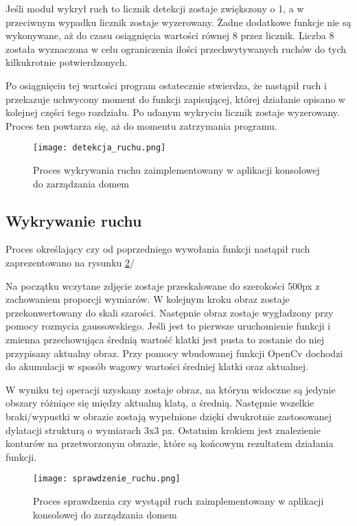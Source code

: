 Jeśli moduł wykrył ruch to licznik detekcji zostaje zwiększony o 1, a w przeciwnym wypadku licznik zostaje wyzerowany. Żadne dodatkowe funkcje nie są wykonywane, aż do czasu osiągnięcia wartości równej 8 przez licznik. Liczba 8 została wyznaczona w celu ograniczenia ilości przechwytywanych ruchów do tych kilkukrotnie potwierdzonych.

Po osiągnięciu tej wartości program ostatecznie stwierdza, że nastąpił ruch i przekazuje uchwycony moment do funkcji zapisującej, której działanie opisano w kolejnej części tego rozdziału. Po udanym wykryciu licznik zostaje wyzerowany. Proces ten powtarza się, aż do momentu zatrzymania programu.
\begin{figure}[H]
	\centering
	\texttt{[image: detekcja\_ruchu.png]}
	\caption{Proces wykrywania ruchu zaimplementowany w aplikacji konsolowej do zarządzania domem}
	\label{fig:proces_detekcji}
\end{figure}

\subsection{Wykrywanie ruchu} \label{ss:wykrywanie}
Proces określający czy od poprzedniego wywołania funkcji nastąpił ruch zaprezentowano na rysunku \ref{fig:wykrywanie_ruchu}/

Na początku wczytane zdjęcie zostaje przeskalowane do szerokości 500px z zachowaniem proporcji wymiarów. W kolejnym kroku obraz zostaje przekonwertowany do skali szarości. Następnie obraz zostaje wygładzony przy pomocy rozmycia gaussowskiego. Jeśli jest to pierwsze uruchomienie funkcji i zmienna przechowująca średnią wartość klatki jest pusta to zostanie do niej przypisany aktualny obraz. Przy pomocy wbudowanej funkcji OpenCv dochodzi do akumulacji w sposób wagowy wartości średniej klatki oraz aktualnej.     

W wyniku tej operacji uzyskany zostaje obraz, na którym widoczne są jedynie obszary różniące się między aktualną klatą, a średnią. Następnie wszelkie braki/wypustki w obrazie zostają wypełnione dzięki dwukrotnie zastosowanej dylatacji strukturą o wymiarach 3x3 px. Ostatnim krokiem jest znalezienie konturów na przetworzonym obrazie, które są końcowym rezultatem działania funkcji.
 \begin{figure}[H]
	\centering
	\texttt{[image: sprawdzenie\_ruchu.png]}
	\caption{Proces sprawdzenia czy wystąpił ruch zaimplementowany w aplikacji konsolowej do zarządzania domem}
	\label{fig:wykrywanie_ruchu}
\end{figure}

